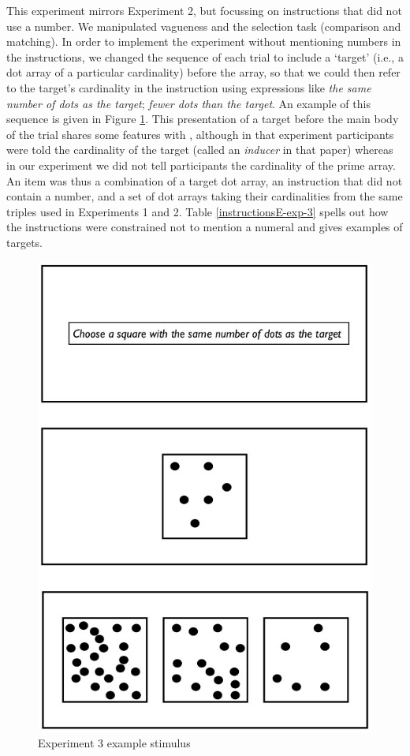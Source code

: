 
This experiment mirrors Experiment 2, but focussing on instructions that did not use a number. We manipulated vagueness and the selection task (comparison and matching). In order to implement the experiment without mentioning numbers in the instructions, we changed the sequence of each trial to include a `target' (i.e., a dot array of a particular cardinality) before the array, so that we could then refer to the target's cardinality in the instruction using expressions like \emph{the same number of dots as the target}; \emph{fewer dots than the target}. An example of this sequence is given in Figure \ref{Experiment3examplestimulus}. This presentation of a target before the main body of the trial shares some features with \citeauthor[Experiment 2]{Izard20081221}, although in that experiment participants were told the cardinality of the target (called an \emph{inducer} in that paper) whereas in our experiment we did not tell participants the cardinality of the prime array. An item was thus a combination of a target dot array, an instruction that did not contain a number, and a set of dot arrays taking their cardinalities from the same triples used in Experiments 1 and 2. Table \ref{instructionsE-exp-3} spells out how the instructions were constrained not to mention a numeral and gives examples of targets.

\begin{figure}[htbp]
\centering
\includegraphics[width=.75\textwidth]{figures/Ee3-flow.jpg}
\caption{Experiment 3 example stimulus}
\label{Experiment3examplestimulus}
\end{figure}

